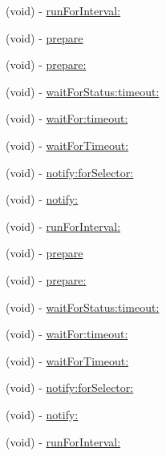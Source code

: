 \begin{DoxyCompactItemize}
\item 
(void) -\/ \hyperlink{interface_g_h_async_test_case_accbc972d3d516d1e53529c84fa2fc510}{run\-For\-Interval\-:}
\item 
(void) -\/ \hyperlink{interface_g_h_async_test_case_a8eda5b64c599e0c48bbd206840bd4cde}{prepare}
\item 
(void) -\/ \hyperlink{interface_g_h_async_test_case_a085b47a16f4a790d77ba78bd2eafb3ff}{prepare\-:}
\item 
(void) -\/ \hyperlink{interface_g_h_async_test_case_ae8781529003ebef3a06569c0157687ae}{wait\-For\-Status\-:timeout\-:}
\item 
(void) -\/ \hyperlink{interface_g_h_async_test_case_a43422127c8303a93f0ae39c883a2da06}{wait\-For\-:timeout\-:}
\item 
(void) -\/ \hyperlink{interface_g_h_async_test_case_aaf22dd45b3493e110362392cc3dc086b}{wait\-For\-Timeout\-:}
\item 
(void) -\/ \hyperlink{interface_g_h_async_test_case_ab1be43eb4f4909ce5607b51fa0a1f40b}{notify\-:for\-Selector\-:}
\item 
(void) -\/ \hyperlink{interface_g_h_async_test_case_ad21d6cdd1f2a284ee7b5ad5b6d1c82e2}{notify\-:}
\item 
(void) -\/ \hyperlink{interface_g_h_async_test_case_accbc972d3d516d1e53529c84fa2fc510}{run\-For\-Interval\-:}
\item 
(void) -\/ \hyperlink{interface_g_h_async_test_case_a8eda5b64c599e0c48bbd206840bd4cde}{prepare}
\item 
(void) -\/ \hyperlink{interface_g_h_async_test_case_a085b47a16f4a790d77ba78bd2eafb3ff}{prepare\-:}
\item 
(void) -\/ \hyperlink{interface_g_h_async_test_case_ae8781529003ebef3a06569c0157687ae}{wait\-For\-Status\-:timeout\-:}
\item 
(void) -\/ \hyperlink{interface_g_h_async_test_case_a43422127c8303a93f0ae39c883a2da06}{wait\-For\-:timeout\-:}
\item 
(void) -\/ \hyperlink{interface_g_h_async_test_case_aaf22dd45b3493e110362392cc3dc086b}{wait\-For\-Timeout\-:}
\item 
(void) -\/ \hyperlink{interface_g_h_async_test_case_ab1be43eb4f4909ce5607b51fa0a1f40b}{notify\-:for\-Selector\-:}
\item 
(void) -\/ \hyperlink{interface_g_h_async_test_case_ad21d6cdd1f2a284ee7b5ad5b6d1c82e2}{notify\-:}
\item 
(void) -\/ \hyperlink{interface_g_h_async_test_case_accbc972d3d516d1e53529c84fa2fc510}{run\-For\-Interval\-:}

\end{DoxyCompactItemize}
